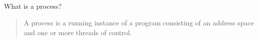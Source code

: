 \subsection*{}
What is a process?
\begin{quote}
    A process is a running instance of a program consisting of an address space and  one or more threads of control.
\end{quote}
    